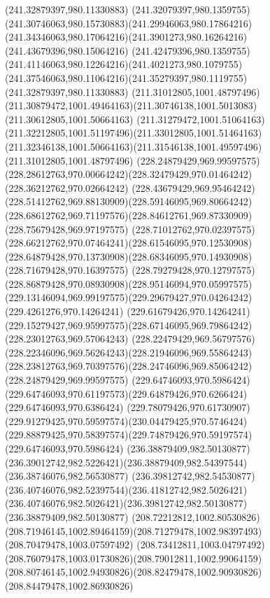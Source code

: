 {{		\moveto(241.32879397,980.11330883)
		\curveto(241.32079397,980.1359755)(241.30746063,980.15730883)(241.29946063,980.17864216)
		\curveto(241.34346063,980.17064216)(241.3901273,980.16264216)(241.43679396,980.15064216)
		\curveto(241.42479396,980.1359755)(241.41146063,980.12264216)(241.4021273,980.1079755)
		\curveto(241.37546063,980.11064216)(241.35279397,980.1119755)(241.32879397,980.11330883)
		\moveto(211.31012805,1001.48797496)
		\curveto(211.30879472,1001.49464163)(211.30746138,1001.5013083)(211.30612805,1001.50664163)
		\curveto(211.31279472,1001.51064163)(211.32212805,1001.51197496)(211.33012805,1001.51464163)
		\curveto(211.32346138,1001.50664163)(211.31546138,1001.49597496)(211.31012805,1001.48797496)
		\moveto(228.24879429,969.99597575)
		\curveto(228.28612763,970.00664242)(228.32479429,970.01464242)(228.36212762,970.02664242)
		\curveto(228.43679429,969.95464242)(228.51412762,969.88130909)(228.59146095,969.80664242)
		\curveto(228.68612762,969.71197576)(228.84612761,969.87330909)(228.75679428,969.97197575)
		\curveto(228.71012762,970.02397575)(228.66212762,970.07464241)(228.61546095,970.12530908)
		\curveto(228.64879428,970.13730908)(228.68346095,970.14930908)(228.71679428,970.16397575)
		\curveto(228.79279428,970.12797575)(228.86879428,970.08930908)(228.95146094,970.05997575)
		\curveto(229.13146094,969.99197575)(229.29679427,970.04264242)(229.4261276,970.14264241)
		\lineto(229.61679426,970.14264241)
		\curveto(229.15279427,969.95997575)(228.67146095,969.79864242)(228.23012763,969.57064243)
		\curveto(228.22479429,969.56797576)(228.22346096,969.56264243)(228.21946096,969.55864243)
		\curveto(228.23812763,969.70397576)(228.24746096,969.85064242)(228.24879429,969.99597575)
		\moveto(229.64746093,970.5986424)
		\curveto(229.64746093,970.61197573)(229.64879426,970.6266424)(229.64746093,970.6386424)
		\curveto(229.78079426,970.61730907)(229.91279425,970.59597574)(230.04479425,970.5746424)
		\curveto(229.88879425,970.58397574)(229.74879426,970.59197574)(229.64746093,970.5986424)
		\moveto(236.38879409,982.50130877)
		\curveto(236.39012742,982.5226421)(236.38879409,982.54397544)(236.38746076,982.56530877)
		\curveto(236.39812742,982.54530877)(236.40746076,982.52397544)(236.41812742,982.5026421)
		\curveto(236.40746076,982.5026421)(236.39812742,982.50130877)(236.38879409,982.50130877)
		\moveto(208.72212812,1002.80530826)
		\curveto(208.71946145,1002.89464159)(208.71279478,1002.98397493)(208.70479478,1003.07597492)
		\curveto(208.73412811,1003.04797492)(208.76079478,1003.01730826)(208.79012811,1002.99064159)
		\curveto(208.80746145,1002.94930826)(208.82479478,1002.90930826)(208.84479478,1002.86930826)
}}
